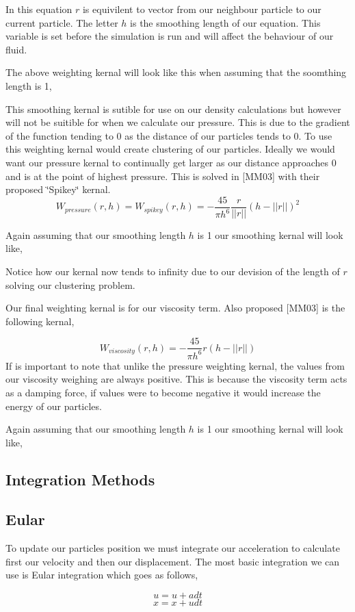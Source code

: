 In this equation $r$ is equivilent to vector from our neighbour particle to our current particle. The letter $h$ is the smoothing length of our equation. This variable is set before the simulation is run and will affect the behaviour of our fluid.\par
The above weighting kernal will look like this when assuming that the soomthing length is 1,\par
 This smoothing kernal is sutible for use on our density calculations but however will not be suitible for when we calculate our pressure. This is due to the gradient of the function tending to 0 as the distance of our particles tends to 0. To use this weighting kernal would create clustering of our particles. Ideally we would want our pressure kernal to continually get larger as our distance approaches 0 and is at the point of highest pressure. This is solved in \mbox{[}M\-M03\mbox{]} with their proposed \char`\"{}\-Spikey\char`\"{} kernal. \[ W_{pressure}(r,h) = W_{spikey}(r,h) = -\frac{45}{\pi h^6} \frac{r}{||r||}(h-||r||)^2 \]

Again assuming that our smoothing length $h$ is 1 our smoothing kernal will look like,\par
 Notice how our kernal now tends to infinity due to our devision of the length of $r$ solving our clustering problem.

Our final weighting kernal is for our viscosity term. Also proposed \mbox{[}M\-M03\mbox{]} is the following kernal,\par
 \[ W_{viscosity}(r,h) = -\frac{45}{\pi h^6}r(h-||r||) \] If is important to note that unlike the pressure weighting kernal, the values from our viscosity weighing are always positive. This is because the viscosity term acts as a damping force, if values were to become negative it would increase the energy of our particles.\par
Again assuming that our smoothing length $h$ is 1 our smoothing kernal will look like,\par
 \subsection*{Integration Methods }

\subsection*{Eular }

To update our particles position we must integrate our acceleration to calculate first our velocity and then our displacement. The most basic integration we can use is Eular integration which goes as follows,\par
 \[ u = u + adt \] \[ x = x + udt \]

